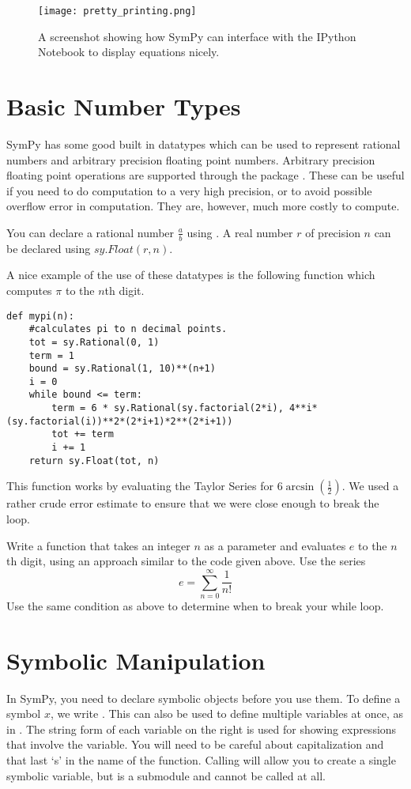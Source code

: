 \begin{figure}
\texttt{[image: pretty\_printing.png]}
\caption{A screenshot showing how SymPy can interface with the IPython Notebook to display equations nicely.}
\label{sympy:pretty_printing}
\end{figure}

\section*{Basic Number Types}
SymPy has some good built in datatypes which can be used to represent rational numbers and arbitrary precision floating point numbers.
Arbitrary precision floating point operations are supported through the package .
These can be useful if you need to do computation to a very high precision, or to avoid possible overflow error in computation.
They are, however, much more costly to compute.

You can declare a rational number $\frac{a}{b}$ using .
A real number $r$ of precision $n$ can be declared using $sy.Float(r,n)$.

A nice example of the use of these datatypes is the following function which computes $\pi$ to the $n$th digit.
\begin{lstlisting}
def mypi(n):
    #calculates pi to n decimal points.
    tot = sy.Rational(0, 1)
    term = 1
    bound = sy.Rational(1, 10)**(n+1)
    i = 0
    while bound <= term:
        term = 6 * sy.Rational(sy.factorial(2*i), 4**i*(sy.factorial(i))**2*(2*i+1)*2**(2*i+1))
        tot += term
        i += 1
    return sy.Float(tot, n)
\end{lstlisting}
This function works by evaluating the Taylor Series for $6\arcsin\left(\frac{1}{2}\right)$.
We used a rather crude error estimate to ensure that we were close enough to break the loop.

\begin{problem}
Write a function  that takes an integer $n$ as a parameter and 
evaluates $e$ to the $n$th digit, using an approach similar to the code given above.
Use the series
\begin{equation*}
e=\sum_{n=0}^{\infty} \frac{1}{n!}
\end{equation*}
Use the same condition as above to determine when to break your while loop.
\end{problem}

\section*{Symbolic Manipulation}
In SymPy, you need to declare symbolic objects before you use them.
To define a symbol $x$, we write .
This can also be used to define multiple variables at once, as in .
The string form of each variable on the right is used for showing expressions that involve the variable.
You will need to be careful about capitalization and that last `s' in the name of the function.
Calling  will allow you to create a single symbolic variable, but  is a submodule and cannot be called at all.

